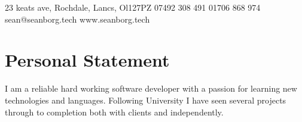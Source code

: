 \documentclass{my_cv}
\begin{document}
\contactInfo
{23 keats ave, Rochdale, Lancs, Ol127PZ}
{07492 308 491}
{01706 868 974}
{sean@seanborg.tech}
{www.seanborg.tech}

\section{Personal Statement}


I am a reliable hard working software developer with a passion for learning new technologies and languages. Following University I have seen several projects through to completion both with clients and independently.
%
%
%
%
%
%
%
%
%
%
%
%
%
\end{document}
